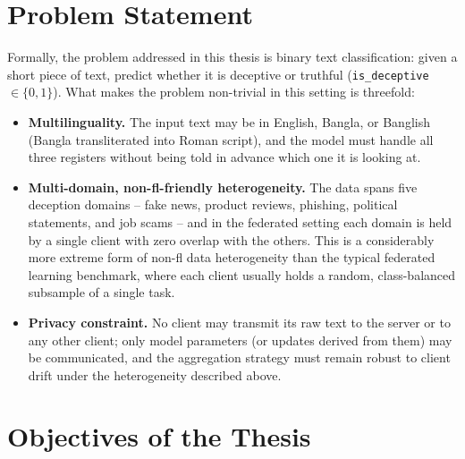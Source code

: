 \section{Problem Statement}

Formally, the problem addressed in this thesis is binary text classification: given a short piece of text, predict whether it is deceptive or truthful (\texttt{is\_deceptive} $\in \{0,1\}$). What makes the problem non-trivial in this setting is threefold:

\begin{itemize}
    \item \textbf{Multilinguality.} The input text may be in English, Bangla, or Banglish (Bangla transliterated into Roman script), and the model must handle all three registers without being told in advance which one it is looking at.
    \item \textbf{Multi-domain, non-\gls{fl}-friendly heterogeneity.} The data spans five deception domains -- fake news, product reviews, phishing, political statements, and job scams -- and in the federated setting each domain is held by a single client with zero overlap with the others. This is a considerably more extreme form of non-\gls{fl} data heterogeneity than the typical federated learning benchmark, where each client usually holds a random, class-balanced subsample of a single task.
    \item \textbf{Privacy constraint.} No client may transmit its raw text to the server or to any other client; only model parameters (or updates derived from them) may be communicated, and the aggregation strategy must remain robust to client drift under the heterogeneity described above.
\end{itemize}

\section{Objectives of the Thesis}


